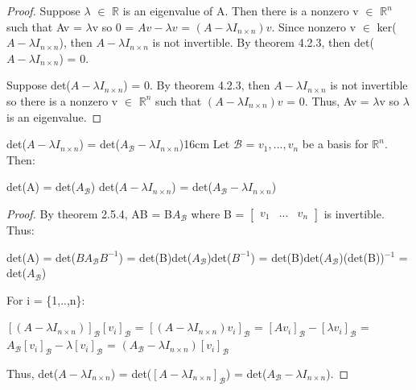     \begin{proof}
        Suppose $\lambda$ $\in$ $\mathbb{R}$ is an eigenvalue of A.
        Then there is a nonzero v $\in$ $\mathbb{R}^n$ such that Av = $\lambda$v
        so 0 = $Av - \lambda v$ = $(A - \lambda I_{n \times n})v$.
        Since nonzero v $\in$ ker($A - \lambda I_{n \times n}$),
        then $A - \lambda I_{n \times n}$ is not invertible.
        By {\color{red} theorem 4.2.3}, then det($A - \lambda I_{n \times n}$) = 0.

        \vspace{0.3cm}

        Suppose det($A - \lambda I_{n \times n}$) = 0.
        By {\color{red} theorem 4.2.3}, then $A - \lambda I_{n \times n}$
        is not invertible so there is a nonzero v $\in$ $\mathbb{R}^n$
        such that $(A - \lambda I_{n \times n})v$ = 0.
        Thus, Av = $\lambda$v so $\lambda$ is an eigenvalue.
    \end{proof}

    \vspace{0.5cm}



    \begin{wtheorem}{det($A - \lambda I_{n \times n}$)
    = det($A_{\mathcal{B}} - \lambda I_{n \times n}$)}{16cm}
        Let $\mathcal{B}$ = $v_1,...,v_n$ be a basis for $\mathbb{R}^n$. Then:

        \hspace{0.5cm}
        det(A) = det($A_{\mathcal{B}}$)
        \hspace{1cm}
        det($A - \lambda I_{n \times n}$)
        = det($A_{\mathcal{B}} - \lambda I_{n \times n}$)
    \end{wtheorem}

    \begin{proof}
        By {\color{red} theorem 2.5.4}, AB = B$A_{\mathcal{B}}$
        where B =
        $\begin{bmatrix}
            v_1 & ... & v_n
        \end{bmatrix}$
        is invertible. Thus:

        \hspace{0.5cm}
        det(A) = det($BA_{\mathcal{B}}B^{-1}$)
        = det(B)det($A_{\mathcal{B}}$)det($B^{-1}$)
        = det(B)det($A_{\mathcal{B}}$)(det(B))$^{-1}$
        = det($A_{\mathcal{B}}$)

        \vspace{0.3cm}

        For i = \{1,..,n\}:

        \hspace{0.5cm}
        $[(A - \lambda I_{n \times n})]_{\mathcal{B}}[v_i]_{\mathcal{B}}$
        = $[(A - \lambda I_{n \times n})v_i]_{\mathcal{B}}$
        = $[Av_i]_{\mathcal{B}} - [\lambda v_i]_{\mathcal{B}}$
        = $A_{\mathcal{B}}[v_i]_{\mathcal{B}} - \lambda[v_i]_{\mathcal{B}}$
        = $(A_{\mathcal{B}} - \lambda I_{n \times n})[v_i]_{\mathcal{B}}$

        Thus,
        det($A - \lambda I_{n \times n}$)
        = det($[A - \lambda I_{n \times n}]_{\mathcal{B}}$)
        = det($A_{\mathcal{B}} - \lambda I_{n \times n}$).
    \end{proof}

